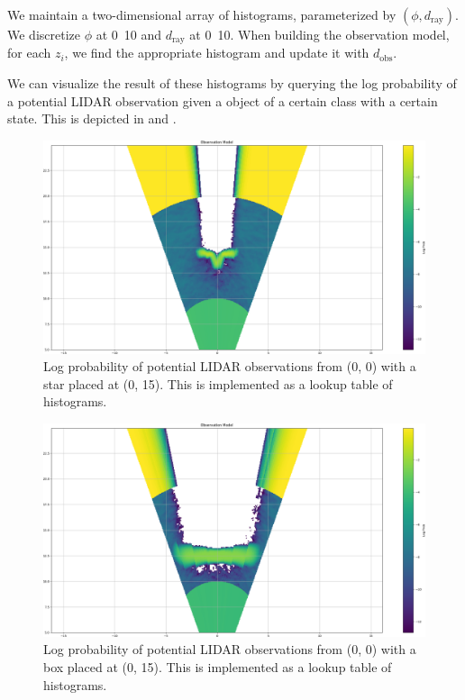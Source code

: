 We maintain a two-dimensional array of histograms, parameterized by $(\phi,
d_{\text{ray}})$. We discretize $\phi$ at \unit{0.10}{\rad} and
$d_{\text{ray}}$ at \unit{0.10}{\m}. When building the observation model, for
each $z_i$, we find the appropriate histogram and update it with
$d_{\text{obs}}$.

We can visualize the result of these histograms by querying the log probability
of a potential LIDAR observation given a object of a certain class with a
certain state. This is depicted in  and
.
%
\begin{figure}
  \centering
  \includegraphics[width=\textwidth]{figures/star_model.png}
  \caption{Log probability of potential LIDAR observations from (0, 0) with a
    star placed at (0, 15). This is implemented as a lookup table of histograms.}
  \label{fig:star_model}
\end{figure}
%
\begin{figure}
  \centering
  \includegraphics[width=\textwidth]{figures/box_model.png}
  \caption{Log probability of potential LIDAR observations from (0, 0) with a
    box placed at (0, 15). This is implemented as a lookup table of histograms.}
  \label{fig:box_model}
\end{figure}


